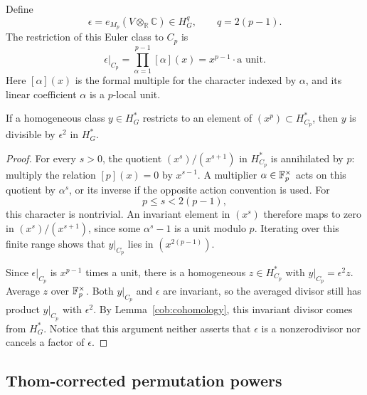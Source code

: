 Define
\begin{equation}
 \label{cob:epsilon}
 \epsilon=e_{M_p}(V\otimes_{\mathbb R}\mathbb C)\in H_G^q,
 \qquad q=2(p-1).
\end{equation}
The restriction of this Euler class to $C_p$ is
\[
 \epsilon|_{C_p}=\prod_{\alpha=1}^{p-1}[\alpha](x)
                  =x^{p-1}\cdot\text{a unit}.
\]
Here $[\alpha](x)$ is the formal multiple for the character indexed by
$\alpha$, and its linear coefficient $\alpha$ is a $p$-local unit.

\begin{lemma}
 \label{cob:euler-divisibility}
 If a homogeneous class $y\in H_G^*$ restricts to an element of
 $(x^p)\subset H_{C_p}^*$, then $y$ is divisible by $\epsilon^2$ in
 $H_G^*$.
\end{lemma}

\begin{proof}
 For every $s>0$, the quotient $(x^s)/(x^{s+1})$ in $H_{C_p}^*$ is
 annihilated by $p$: multiply the relation $[p](x)=0$ by $x^{s-1}$.
 A multiplier $\alpha\in\mathbb F_p^\times$ acts on this quotient by
 $\alpha^s$, or its inverse if the opposite action convention is used.
 For
 \[
  p\leq s<2(p-1),
 \]
 this character is nontrivial.  An invariant element in $(x^s)$
 therefore maps to zero in $(x^s)/(x^{s+1})$, since some
 $\alpha^s-1$ is a unit modulo $p$.  Iterating over this finite range
 shows that $y|_{C_p}$ lies in $(x^{2(p-1)})$.

 Since $\epsilon|_{C_p}$ is $x^{p-1}$ times a unit, there is a
 homogeneous $z\in H_{C_p}^*$ with
 $y|_{C_p}=\epsilon^2z$.  Average $z$ over $\mathbb F_p^\times$.
 Both $y|_{C_p}$ and $\epsilon$ are invariant, so the averaged divisor
 still has product $y|_{C_p}$ with $\epsilon^2$.  By
 Lemma~\ref{cob:cohomology}, this invariant divisor comes from $H_G^*$.
 Notice that this argument neither asserts that $\epsilon$ is a
 nonzerodivisor nor cancels a factor of $\epsilon$.
\end{proof}

\subsection{Thom-corrected permutation powers}

